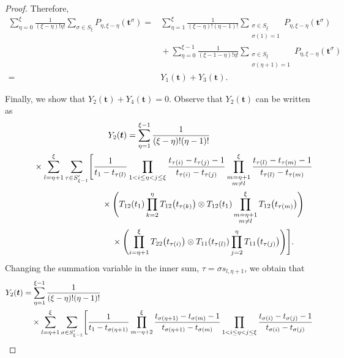 \documentclass[10pt,a4paper]{amsart}
\numberwithin{equation}{section}
\begin{document}
\begin{proof}
Therefore,
\begin{align*}
\sum_{\eta=0}^\xi \frac{1}{(\xi-\eta)!\eta!}\sum_{\sigma\in S_\xi} P_{\eta,\xi-\eta}(\boldsymbol{t}^\sigma)={}&\sum_{\eta=1}^\xi \frac{1}{(\xi-\eta)!(\eta-1)!} \sum_{\substack{\sigma\in S_\xi\\\sigma(1)=1}} P_{\eta,\xi-\eta}(\boldsymbol{t}^\sigma) \\
&{}{+} \sum_{\eta=0}^{\xi-1} \frac{1}{(\xi-1-\eta)!\eta!}\sum_{\substack{\sigma\in S_\xi\\\sigma(\eta+1)=1}}P_{\eta,\xi-\eta}(\boldsymbol{t}^\sigma)
\\
={}& Y_1(\boldsymbol{t})+Y_3(\boldsymbol{t}).
\end{align*}

Finally, we show that $Y_2(\boldsymbol{t})+Y_4(\boldsymbol{t})=0$.
Observe that $Y_2(\boldsymbol{t})$ can be written as
\begin{gather*}
Y_2(\boldsymbol{t})= \sum_{\eta=1}^{\xi-1} \frac{1}{(\xi-\eta) ! (\eta-1)!}\\
\hphantom{Y_2(\boldsymbol{t})=}{}
 \times\sum_{l=\eta+1}^\xi \sum_{\tau\in S_{\xi-1}'} \Biggl[ \frac{1}{t_1-t_{\tau(l)}} \prod_{1< i\leq\eta<j \leq \xi} \frac{t_{\tau(i)}-t_{\tau(j)}-1}{t_{\tau(i)}-t_{\tau(j)}} \prod_{\substack{m=\eta+1\\m\neq l}}^\xi \frac{t_{\tau(l)}-t_{\tau(m)}-1}{t_{\tau(l)}-t_{\tau(m)}}\\
\hphantom{Y_2(\boldsymbol{t})=\times\sum_{l=\eta+1}^\xi \sum_{\tau\in S_{\xi-1}'} \Biggl[}{}
\times\Biggl( T_{12} (t_1)\prod_{k=2}^{\eta} T_{12} \bigl(t_{\tau(k)}\bigr) \otimes T_{12}(t_1) \prod_{\substack{m=\eta+1\\m\neq l}}^\xi T_{12} \bigl(t_{\tau(m)}\bigr)\Biggr)\\
\hphantom{Y_2(\boldsymbol{t})=\times\sum_{l=\eta+1}^\xi \sum_{\tau\in S_{\xi-1}'} \Biggl[}{}
\times \Biggl( \prod_{i=\eta+1}^{\xi } T _{22}\bigl(t_{\tau(i)}\bigr)\otimes T_{11}(t_{\tau(l)})\prod_{j=2}^{\eta} T _{11}\bigl(t_{\tau(j)}\bigr)\Biggr) \Biggr].
\end{gather*}
Changing the summation variable in the inner sum, $\tau=\sigma s_{l,\eta+1}$, we obtain that
\begin{gather*}
\begin{split}
&Y_2(\boldsymbol{t})= \sum_{\eta=1}^{\xi-1} \frac{1}{(\xi-\eta) ! (\eta-1)!}\\
&\hphantom{Y_2(\boldsymbol{t})=}{}
 \times\sum_{l=\eta+1}^\xi \sum_{\sigma\in S_{\xi-1}'} \Biggl[ \frac{1}{t_1-t_{\sigma(\eta+1)}} \prod_{m=\eta+2}^\xi \frac{t_{\sigma(\eta+1)}-t_{\sigma(m)}-1}{t_{\sigma(\eta+1)}-t_{\sigma(m)}} \prod_{1< i\leq\eta<j \leq \xi} \frac{t_{\sigma(i)}-t_{\sigma(j)}-1}{t_{\sigma(i)}-t_{\sigma(j)}} \\

\end{split}
\end{gather*}
\end{proof}
\end{document}
